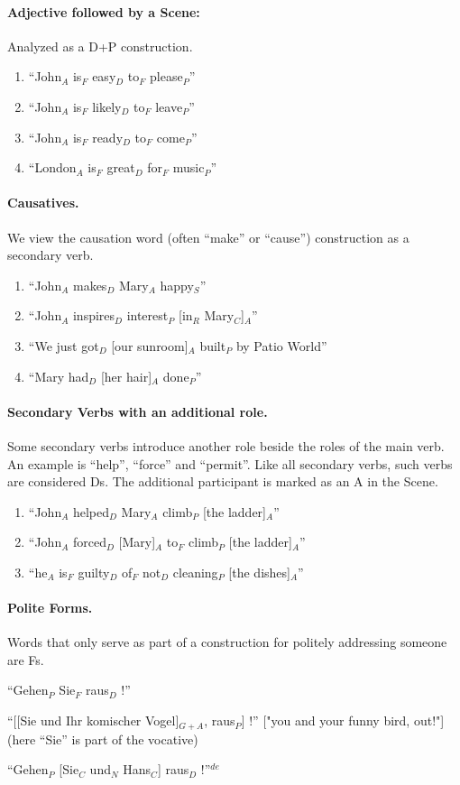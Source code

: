 \documentclass[11pt]{article}
\newcommand{\be}{\begin{enumerate}}
\newcommand{\ee}{\end{enumerate}}
\newcommand{\german}[1]{{\color{red}#1$^{de}$}}
\newcommand{\dd}[1]{{\color{blue}{#1}}}
\begin{document}
\paragraph{Adjective followed by a Scene:} Analyzed as a D+P construction.
\be 
\item
``John$_A$ is$_F$ easy$_D$ to$_F$ please$_P$''
\item
``John$_A$ is$_F$ likely$_D$ to$_F$ leave$_P$''
\item
``John$_A$ is$_F$ ready$_D$ to$_F$ come$_P$''
\item
``London$_A$ is$_F$ great$_D$ for$_F$ music$_P$''
\ee
 
\paragraph{Causatives.} We view the causation word (often ``make'' or ``cause'') construction as a secondary verb.
\be \item
``John$_A$ makes$_D$ Mary$_A$ happy$_S$''
\item
``John$_A$ inspires$_D$ interest$_P$ [in$_R$ Mary$_C$]$_A$''
\item
``We just got$_D$ [our sunroom]$_A$ built$_P$ by Patio World''
\item
``Mary had$_D$ [her hair]$_A$ done$_P$''
\ee

\paragraph{Secondary Verbs with an additional role.}
Some secondary verbs introduce another role beside the roles of the main verb. An example is ``help'', ``force'' and ``permit''. Like all secondary verbs, such verbs are considered Ds. The additional participant is marked as an A in the Scene.
\be \item
``John$_A$ helped$_D$ Mary$_A$ climb$_P$ [the ladder]$_A$''
\item
``John$_A$ forced$_D$ [Mary]$_A$ to$_F$ climb$_P$ [the ladder]$_A$''
\item
``he$_A$ is$_F$ guilty$_D$ of$_F$ not$_D$ cleaning$_P$ [the dishes]$_A$''
\ee

\paragraph{Polite Forms.} Words that only serve as part of a construction for politely addressing someone are Fs.

\begin{enumerate}
\german{
\item
``Gehen$_P$ Sie$_F$ raus$_D$ !'' 
\item
``[[Sie und Ihr komischer Vogel]$_{G+A}$, raus$_P$] !'' ["you and your funny bird, out!"] (here ``Sie'' is part of the vocative)
\item
``Gehen$_P$ [Sie$_C$ und$_N$ Hans$_C$] raus$_D$ !''}
\dd {\item 
``I [would like UNA]$_F$ to thank you for all your help``
\item
``Could$_D$ you$_A$ help$_P$ me$_A$, please$_F$?``}
\end{enumerate}
\end{document}
